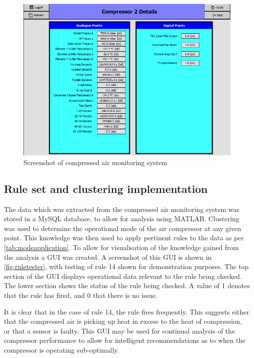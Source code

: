 \begin{figure}
\includegraphics[width = 0.9 \textwidth]{./Images/JACE_Screen.png}
\caption{Screenshot of compressed air monitoring system}
\label{fig:jacescreen}
\end{figure}

\subsection{Rule set and clustering implementation}
The data which was extracted from the compressed air monitoring system was stored in a MySQL database, to allow for analysis using MATLAB. Clustering was used to determine the operational mode of the air compressor at any given point. This knowledge was then used to apply pertinent rules to the data as per \autoref{tab:modeapplication}. To allow for visualisation of the knowledge gained from the analysis a GUI was created. A screenshot of this GUI is shown in \autoref{fig:ruletester}, with testing of rule 14 shown for demonstration purposes. The top section of the GUI displays operational data relevant to the rule being checked. The lower section shows the status of the rule being checked. A value of 1 denotes that the rule has fired, and 0 that there is no issue. 

It is clear that in the case of rule 14, the rule fires frequently. This suggests either that the compressed air is picking up heat in excess to the heat of compression, or that a sensor is faulty. This GUI may be used for continual analysis of the compressor performance to allow for intelligent recommendations as to when the compressor is operating sub-optimally.

